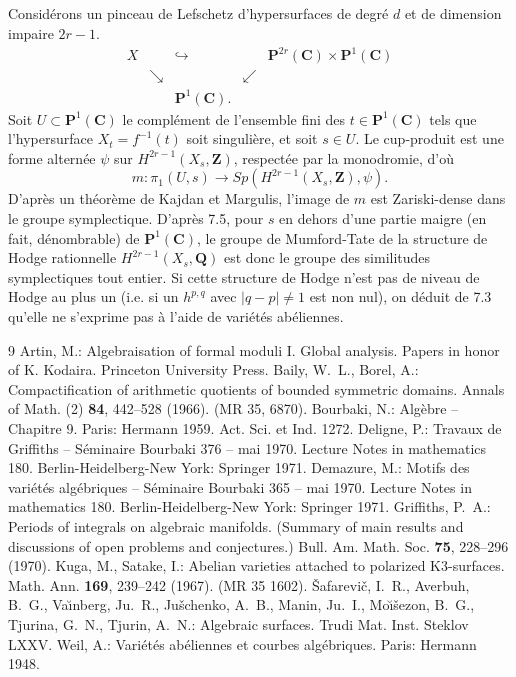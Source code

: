 \documentclass[11pt]{amsart}
\theoremstyle{plain}
\theoremstyle{definition}
\theoremstyle{remark}
\begin{document}
\subsection*{}
Consid\'erons un pinceau de Lefschetz d'hypersurfaces de degr\'e $d$ et de dimension impaire $2r-1$.
\begin{equation*}
\begin{array}{ccccc}
X & & \hookrightarrow & & \mathbf{P}^{2r}(\mathbf{C})\times\mathbf{P}^1(\mathbf{C}) \\
& \searrow & & \swarrow & \\
& & \mathbf{P}^1(\mathbf{C}). & &
\end{array}
\end{equation*}
Soit $U\subset\mathbf{P}^1(\mathbf{C})$ le compl\'ement de l'ensemble fini des $t\in\mathbf{P}^1(\mathbf{C})$ tels que l'hypersurface $X_t=f^{-1}(t)$ soit singuli\`ere, et soit $s\in U$. Le cup-produit est une forme altern\'ee $\psi$ sur $H^{2r-1}(X_s,\mathbf{Z})$, respect\'ee par la monodromie, d'o\`u
\begin{equation*}
m\colon\pi_1(U,s)\to Sp(H^{2r-1}(X_s,\mathbf{Z}),\psi).
\end{equation*}
D'apr\`es un th\'eor\`eme de Kajdan et Margulis, l'image de $m$ est Zariski-dense dans le groupe symplectique. D'apr\`es 7.5, pour $s$ en dehors d'une partie maigre (en fait, d\'enombrable) de $\mathbf{P}^1(\mathbf{C})$, le groupe de Mumford-Tate de la structure de Hodge rationnelle $H^{2r-1}(X_s,\mathbf{Q})$ est donc le groupe des similitudes symplectiques tout entier. Si cette structure de Hodge n'est pas de niveau de Hodge au plus un (i.e. si un $h^{p,q}$ avec $|q-p|\neq 1$ est non nul), on d\'eduit de 7.3 qu'elle ne s'exprime pas \`a l'aide de vari\'et\'es ab\'eliennes.

\begin{thebibliography}{9}
 Artin, M.: Algebraisation of formal moduli I. Global analysis. Papers in honor of K. Kodaira. Princeton University Press.
 Baily, W.~L., Borel, A.: Compactification of arithmetic quotients of bounded symmetric domains. Annals of Math. (2) \textbf{84}, 442--528 (1966). (MR 35, 6870).
 Bourbaki, N.: Alg\`ebre -- Chapitre 9. Paris: Hermann 1959. Act. Sci. et Ind. 1272.
 Deligne, P.: Travaux de Griffiths -- S\'eminaire Bourbaki 376 -- mai 1970. Lecture Notes in mathematics 180. Berlin-Heidelberg-New York: Springer 1971.
 Demazure, M.: Motifs des vari\'et\'es alg\'ebriques -- S\'eminaire Bourbaki 365 -- mai 1970. Lecture Notes in mathematics 180. Berlin-Heidelberg-New York: Springer 1971.
 Griffiths, P.~A.: Periods of integrals on algebraic manifolds. (Summary of main results and discussions of open problems and conjectures.) Bull. Am. Math. Soc. \textbf{75}, 228--296 (1970).
 Kuga, M., Satake, I.: Abelian varieties attached to polarized K3-surfaces. Math. Ann. \textbf{169}, 239--242 (1967). (MR 35 1602).
 \v{S}afarevi\v{c}, I.~R., Averbuh, B.~G., Va\u{\i}nberg, Ju.~R., Ju\v{s}\-chenko, A.~B., Manin, Ju.~I., Mo\u{\i}\v{s}e\-zon, B.~G., Tjurina, G.~N., Tjurin, A.~N.: Algebraic surfaces. Trudi Mat. Inst. Steklov LXXV.
 Weil, A.: Vari\'et\'es ab\'eliennes et courbes alg\'ebriques. Paris: Hermann 1948.
\end{thebibliography}
\end{document}
